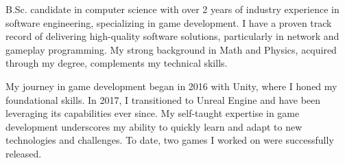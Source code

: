 

\begin{cvparagraph}

B.Sc. candidate in computer science with over 2 years of industry experience in software engineering, specializing in game development. I have a proven track record of delivering high-quality software solutions, particularly in network and gameplay programming. My strong background in Math and Physics, acquired through my degree, complements my technical skills.

My journey in game development began in 2016 with Unity, where I honed my foundational skills. In 2017, I transitioned to Unreal Engine and have been leveraging its capabilities ever since. My self-taught expertise in game development underscores my ability to quickly learn and adapt to new technologies and challenges. To date, two games I worked on were successfully released.

\end{cvparagraph}